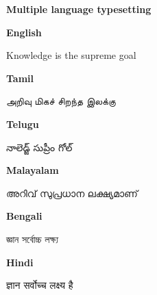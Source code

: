 \documentclass[16pt,a4paper]{article}
\begin{document}
\textbf{\Large Multiple language typesetting}
\bigskip

\par\textbf{English}
\par Knowledge is the supreme goal
\medskip

\textbf{Tamil}
\par {}
அறிவு மிகச் சிறந்த இலக்கு
\medskip

\textbf{Telugu} 
\par{}
నాలెడ్జ్ సుప్రీం గోల్
\medskip

\textbf{Malayalam} 
\par {}
അറിവ് സുപ്രധാന ലക്ഷ്യമാണ്
\medskip

\textbf{Bengali} 
\par{}
জ্ঞান সর্বোচ্চ লক্ষ্য
\medskip

\textbf{Hindi} 
\par {}
ज्ञान सर्वोच्च लक्ष्य है
\medskip
\end{document}
